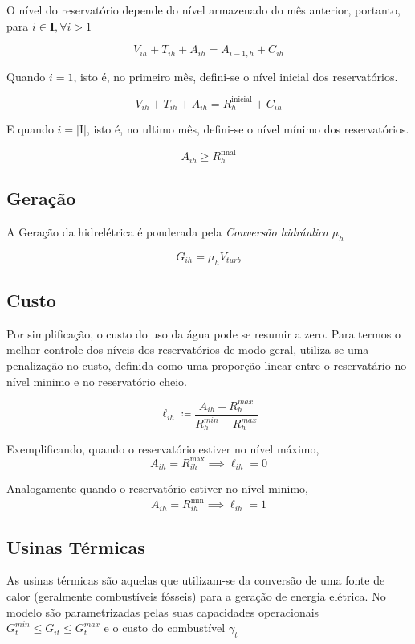 \documentclass[12pt]{article}
\begin{document}
O nível do reservatório depende do nível armazenado do mês anterior, portanto, para $ i \in \textbf{I}, \forall i > 1 $

\[V_{ih} + T_{ih} + A_{ih} = A_{i-1,h} + C_{ih}
\tag{Conservação hidraulica}\]

Quando $i = 1$, isto é, no primeiro mês, defini-se o nível inicial dos reservatórios.

\[ V_{ih} + T_{ih} + A_{ih} = R^\textrm{inicial}_{h} + C_{ih}
\tag{Condição inicial}\]

E quando $i = |\mathrm{I}|$, isto é, no ultimo mês, defini-se o nível mínimo dos reservatórios.

\[A_{ih} \geq R^\textrm{final}_h
\tag{Condição final}\]

\subsection*{Geração}

A Geração da hidrelétrica é ponderada pela \textit{Conversão hidráulica} $ \mu_h $

\[ G_{ih} = \mu_h V_{turb} \]

\subsection*{Custo}

Por simplificação, o custo do uso da água pode se resumir a zero. Para termos o melhor controle dos níveis dos reservatórios de modo geral, utiliza-se uma penalização no custo, definida como uma proporção linear entre o reservatário no nível minimo e no reservatório cheio.

\[ \ell_{ih} \coloneqq \frac{A_{ih}-R^{max}_{h}}{R^{min}_{h} - R^{max}_{h}} \tag{Penalização do Reservatório} \]

Exemplificando, quando o reservatório estiver no nível máximo, \[A_{ih} = R^\text{max}_{ih} \implies \ell_{ih} = 0\]

Analogamente quando o reservatório estiver no nível minimo, \[A_{ih} = R^\text{min}_{ih} \implies \ell_{ih} = 1\]

\subsection*{Usinas Térmicas}

As usinas térmicas são aquelas que utilizam-se da conversão de uma fonte de calor (geralmente combustíveis fósseis) para a geração de energia elétrica. No modelo são parametrizadas pelas suas capacidades operacionais $ G_{t}^{min} \leq G_{it} \leq G_{t}^{max} $ e o custo do combustível $ \gamma_t $
\end{document}
